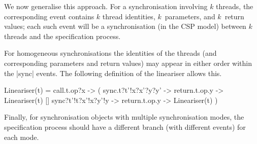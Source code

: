 We now generalise this approach.  For a synchronisation involving $k$ threads,
the corresponding  event contains $k$ thread identities,
$k$~parameters, and $k$~return values; each such event will be a
synchronisation (in the CSP model) between $k$ threads and the specification
process. 

For homogeneous synchronisations the identities of the threads (and
corresponding parameters and return values) may appear in either order within
the |sync| events.  The following definition of the lineariser allows this. 
%
\begin{cspm}
Lineariser(t) = 
  call.t.op?x -> (
    sync.t?t'!x?x'?y?y' -> return.t.op.y -> Lineariser(t)
    []
    sync?t'!t?x'!x?y'!y -> return.t.op.y -> Lineariser(t)
  )
\end{cspm}

Finally, for synchronisation objects with multiple synchronisation modes, the
specification process should have a different branch (with different
 events) for each mode.
